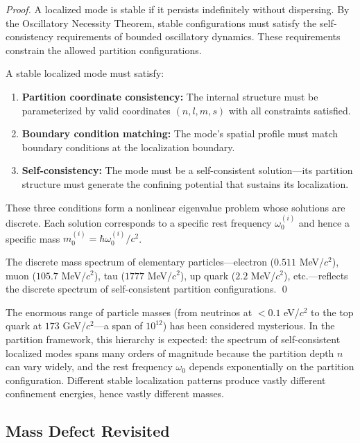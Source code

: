 \begin{proof}
A localized mode is stable if it persists indefinitely without dispersing. By the Oscillatory Necessity Theorem, stable configurations must satisfy the self-consistency requirements of bounded oscillatory dynamics. These requirements constrain the allowed partition configurations.

A stable localized mode must satisfy:
\begin{enumerate}
    \item \textbf{Partition coordinate consistency:} The internal structure must be parameterized by valid coordinates $(n, l, m, s)$ with all constraints satisfied.
    \item \textbf{Boundary condition matching:} The mode's spatial profile must match boundary conditions at the localization boundary.
    \item \textbf{Self-consistency:} The mode must be a self-consistent solution---its partition structure must generate the confining potential that sustains its localization.
\end{enumerate}

These three conditions form a nonlinear eigenvalue problem whose solutions are discrete. Each solution corresponds to a specific rest frequency $\omega_0^{(i)}$ and hence a specific mass $m_0^{(i)} = \hbar\omega_0^{(i)}/c^2$.

The discrete mass spectrum of elementary particles---electron ($0.511$ MeV/$c^2$), muon ($105.7$ MeV/$c^2$), tau ($1777$ MeV/$c^2$), up quark ($2.2$ MeV/$c^2$), etc.---reflects the discrete spectrum of self-consistent partition configurations. \qed
\end{proof}

\begin{remark}
The enormous range of particle masses (from neutrinos at $< 0.1$ eV/$c^2$ to the top quark at $173$ GeV/$c^2$---a span of $10^{12}$) has been considered mysterious. In the partition framework, this hierarchy is expected: the spectrum of self-consistent localized modes spans many orders of magnitude because the partition depth $n$ can vary widely, and the rest frequency $\omega_0$ depends exponentially on the partition configuration. Different stable localization patterns produce vastly different confinement energies, hence vastly different masses.
\end{remark}

\subsection{Mass Defect Revisited}

